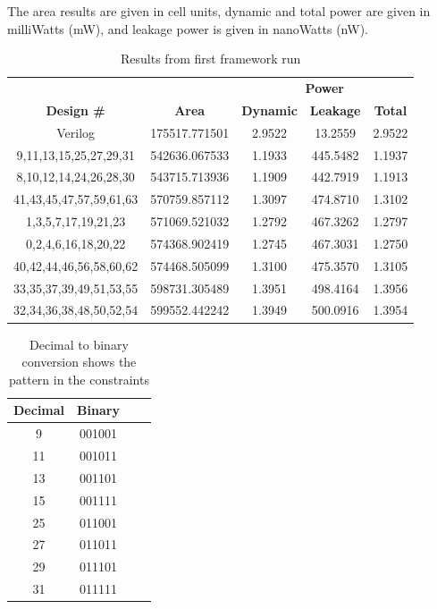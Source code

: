 The area results are given in cell units, dynamic and total power are given in milliWatts (mW), and leakage power is given in nanoWatts (nW).

\newcommand{\specialcell}[2][c]{%
  \begin{tabular}[#1]{@{}c@{}}#2\end{tabular}}
\begin{table}[hbtp]
    \centering
    \begin{tabular}{ccccc}
    & & \multicolumn{3}{c}{\textbf{Power}} \\
    \cline{3-5}
    \textbf{Design \#} & \textbf{Area} & \textbf{Dynamic} & \textbf{Leakage} & \textbf{Total} \\
    \toprule
    Verilog & 175517.771501 & 2.9522 & 13.2559 & 2.9522 \\
    9,11,13,15,25,27,29,31 & 542636.067533 & 1.1933 & 445.5482 & 1.1937 \\
    8,10,12,14,24,26,28,30 & 543715.713936 & 1.1909 & 442.7919 & 1.1913 \\
    41,43,45,47,57,59,61,63 & 570759.857112 & 1.3097 & 474.8710 & 1.3102 \\
    1,3,5,7,17,19,21,23 & 571069.521032 & 1.2792 & 467.3262 & 1.2797 \\
    0,2,4,6,16,18,20,22 & 574368.902419 & 1.2745 & 467.3031 & 1.2750 \\
    40,42,44,46,56,58,60,62 & 574468.505099 & 1.3100 & 475.3570 & 1.3105 \\
    33,35,37,39,49,51,53,55 & 598731.305489 & 1.3951 & 498.4164 & 1.3956 \\
    32,34,36,38,48,50,52,54 & 599552.442242 & 1.3949 & 500.0916 & 1.3954 \\
    \bottomrule
    \end{tabular}
    \caption{Results from first framework run}
    \label{tab:hlsrun1dataresults}
\end{table}

\begin{table}[hbtp]
    \centering
    \begin{tabular}{cccc}
    \textbf{Decimal} & \textbf{Binary}\\
    \toprule
    9 & 001001 \\
    11 & 001011 \\
    13 & 001101 \\
    15 & 001111 \\
    25 & 011001 \\
    27 & 011011 \\
    29 & 011101 \\
    31 & 011111 \\
    \bottomrule
    \end{tabular}
    \caption{Decimal to binary conversion shows the pattern in the constraints}
    \label{tab:dectobinconstraints}
\end{table}



